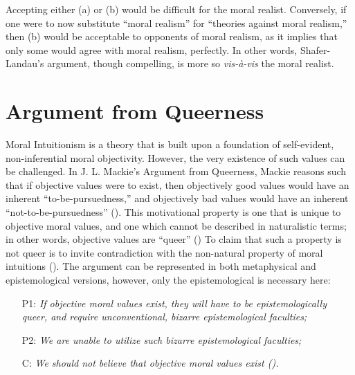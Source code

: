Accepting either (a) or (b) would be difficult for the moral realist. Conversely, if one were to now substitute “moral realism” for “theories against moral realism,” then (b) would be acceptable to opponents of moral realism, as it implies that only some would agree with moral realism, perfectly. In other words, Shafer-Landau’s argument, though compelling, is more so \emph{vis-à-vis} the moral realist. 

\section{Argument from Queerness}

Moral Intuitionism is a theory that is built upon a foundation of self-evident, non-inferential moral objectivity. However, the very existence of such values can be challenged. In J. L. Mackie’s Argument from Queerness, Mackie reasons such that if objective values were to exist, then objectively good values would have an inherent “to-be-pursuedness,” and objectively bad values would have an inherent “not-to-be-pursuedness” (\cites[p.\ 40]{mackie1978ethics}[p.\ 104]{olson2014moral}). This motivational property is one that is unique to objective moral values, and one which cannot be described in naturalistic terms; in other words, objective values are “queer” (\cites[pp.\ 2–3]{scholl2015defense}[p.\ 33]{mackie1978ethics}) To claim that such a property is not queer is to invite contradiction with the non-natural property of moral intuitions (\cite[p.\ 41]{mackie1978ethics}). The argument can be represented in both metaphysical and epistemological versions, however, only the epistemological is necessary here:  

\begin{enumerate}

	\item[P1:] \textit{If objective moral values exist, they will have to be epistemologically queer, and require unconventional, bizarre epistemological faculties;}

	\item[P2:] \textit{We are unable to utilize such bizarre epistemological faculties;}

	\item[C:] \textit{We should not believe that objective moral values exist (\cites[pp.\ 38–41]{mackie1978ethics}[pp.\ 1–2]{lillehammer2019queerness}).}

\end{enumerate}

